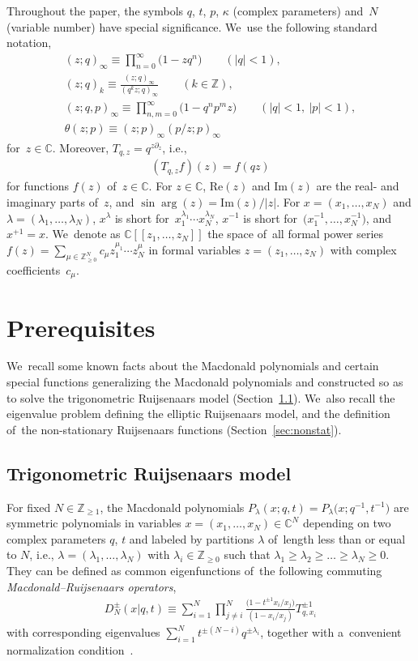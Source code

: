 \documentclass[pdftex]{sigma}%
\numberwithin{equation}{section}
\renewcommand{\Re}{\mathrm{Re}}
\renewcommand{\Im}{\mathrm{Im}}
\newcommand{\C}{{\mathbb C}}
\newcommand{\Z}{{\mathbb Z}}
\begin{document}
\medskip

 Throughout the paper, the symbols $q$, $t$, $p$, $\kappa$ (complex parameters) and~$N$ (variable number) have special significance. We~use the following standard notation,
\begin{gather*}
(z;q)_\infty \equiv \prod_{n=0}^\infty\big(1-zq^n\big)\qquad (|q|<1),
\\
(z;q)_k\equiv \frac{(z;q)_\infty}{(q^k z;q)_\infty} \qquad (k\in\Z),
\\
(z;q,p)_\infty\equiv \prod_{n,m=0}^\infty \big(1-q^np^m z\big)\qquad (|q|<1,\ |p|<1),
\\
\theta(z;p) \equiv (z;p)_\infty(p/z;p)_\infty
\end{gather*}
for~$z\in\C$. Moreover, $T_{q,z}=q^{z\partial_z}$, i.e.,
\begin{gather*}
(T_{q,z}f)(z)=f(qz)
\end{gather*}
for functions $f(z)$ of~$z\in\C$.
For $z\in\C$, $\Re(z)$ and $\Im(z)$ are the real- and imaginary parts of~$z$, and $\sin\arg(z) = \Im(z)/|z|$. For $x=(x_1,\dots,x_N)$ and $\lambda=(\lambda_1,\dots,\lambda_N)$, $x^\lambda$ is short for~$x_1^{\lambda_1}\cdots x_N^{\lambda_N}$, $x^{-1}$ is short for~$\big(x_1^{-1},\dots,x_N^{-1}\big)$, and $x^{+1}=x$.
We~denote as $\C[[z_1,\dots,z_N]]$ the space of~all formal power series $f(z)=\sum_{\mu\in\Z_{\geq 0}^N}c_\mu z_1^{\mu_1}\cdots z_N^{\mu}$ in formal variables $z=(z_1,\dots, z_N)$ with complex coefficients~$c_\mu$.

\section{Prerequisites}
We~recall some known facts about the Macdonald polynomials \cite{MacD} and certain special functions generalizing the Macdonald polynomials and constructed so as to solve the trigonometric Ruijsenaars model \cite{NS,S05} (Section~\ref{sec:trig}). We~also recall the eigenvalue problem defining the elliptic Ruijsenaars model, and the definition of~the non-stationary Ruijsenaars functions (Section~\ref{sec:nonstat}).

\subsection{Trigonometric Ruijsenaars model}\label{sec:trig}
For fixed $N\in\Z_{\geq 1}$, the Macdonald polynomials $P_\lambda(x;q,t)=P_\lambda\big(x;q^{-1},t^{-1}\big)$ are symmetric polynomials in variables $x=(x_1,\dots,x_N)\in\C^N$ depending on two complex parameters $q$, $t$ and labeled by partitions $\lambda$ of~length less than or equal to $N$, i.e., $\lambda=(\lambda_1,\dots,\lambda_N)$ with $\lambda_i\in \Z_{\geq 0}$ such that $\lambda_1\geq \lambda_2\geq \dots \geq \lambda_N\geq 0$.
They can be defined as common eigenfunctions of~the following commuting {\em Macdonald--Ruijsenaars operators},
\begin{gather}\label{MR}
D^{\pm}_N(x|q,t) \equiv \sum_{i=1}^N \prod_{j\neq i}^N \frac{\big(1-t^{\pm 1}x_i/x_j\big)}{(1-x_i/x_j)} T_{q,x_i}^{\pm 1}
\end{gather}
with corresponding eigenvalues $\sum_{i=1}^N t^{\pm(N-i)}q^{\pm{\lambda_i}}$, together with a~convenient normalization condition~\cite{MacD}.
\end{document}
